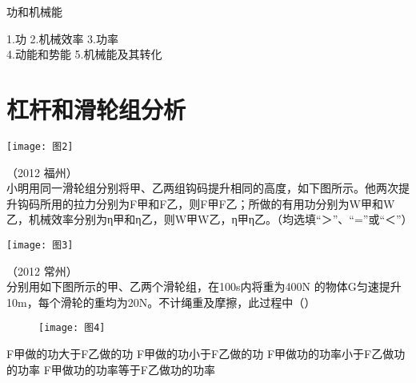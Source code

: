 \documentclass[12pt]{exam}
\newcommand{\keti}{功和机械能}
\newcommand{\zhongdian}{1.功 2.机械效率 3.功率  \\4.动能和势能 5.机械能及其转化}
\begin{document}
\vspace*{80pt}
\keti \par
\zhongdian \par
\section{杠杆和滑轮组分析}
\texttt{[image: 图2]} 

\begin{questions}
\setcounter{question}{3}
\question
（2012 福州）\\
小明用同一滑轮组分别将甲、乙两组钩码提升相同的高度，如下图所示。他两次提升钩码所用的拉力分别为F甲和F乙，则F甲\answerline*[<] F乙；所做的有用功分别为W甲和W乙，机械效率分别为η甲和η乙，则W甲\answerline*[<] W乙，η甲\answerline*[<] η乙。（均选填“＞”、“=”或“＜”）

\texttt{[image: 图3]} 

\question
（2012 常州）\\
分别用如下图所示的甲、乙两个滑轮组，在100s内将重为400N 的物体G匀速提升10m，每个滑轮的重均为20N。不计绳重及摩擦，此过程中（\answerline*[D]）
\begin{multicols}{2}
\begin{figure}[H]
\centering
\texttt{[image: 图4]}
\end{figure}
\columnbreak
\begin{choices}
\choice F甲做的功大于F乙做的功
\choice F甲做的功小于F乙做的功
\choice F甲做功的功率小于F乙做功的功率
\choice F甲做功的功率等于F乙做功的功率
\end{choices}

\end{multicols}
\end{questions}
\end{document}
